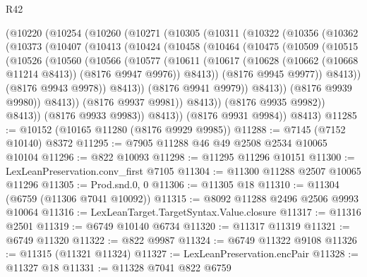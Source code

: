 \begin{lexlean}{R42}
\begin{coremodule}
{      (@10220
        (@10254
          (@10260
            (@10271
              (@10305
                (@10311
                  (@10322
                    (@10356
                      (@10362
                        (@10373
                          (@10407
                            (@10413
                              (@10424
                                (@10458
                                  (@10464
                                    (@10475
                                      (@10509
                                        (@10515
                                          (@10526
                                            (@10560
                                              (@10566
                                                (@10577
                                                  (@10611
                                                    (@10617
                                                      (@10628
                                                        (@10662 (@10668 @11214 @8413))
                                                        (@8176 @9947 @9976))
                                                      @8413))
                                                  (@8176 @9945 @9977))
                                                @8413))
                                            (@8176 @9943 @9978))
                                          @8413))
                                      (@8176 @9941 @9979))
                                    @8413))
                                (@8176 @9939 @9980))
                              @8413))
                          (@8176 @9937 @9981))
                        @8413))
                    (@8176 @9935 @9982))
                  @8413))
              (@8176 @9933 @9983))
            @8413))
        (@8176 @9931 @9984))
      @8413)
@11285 := @10152 (@10165 @11280 (@8176 @9929 @9985))
@11288 := @7145 (@7152 @10140) @8372
@11295 := @7905 @11288 @46 @49 @2508 @2534 @10065 @10104
@11296 := @822 @10093
@11298 := @11295 @11296 @10151
@11300 := LexLeanPreservation.conv_first @7105
@11304 := @11300 @11288 @2507 @10065 @11296
@11305 := Prod.snd.{0, 0}
@11306 := @11305 @18
@11310 := @11304 (@6759 (@11306 @7041 @10092))
@11315 := @8092 @11288 @2496 @2506 @9993 @10064
@11316 := LexLeanTarget.TargetSyntax.Value.closure
@11317 := @11316 @2501
@11319 := @6749 @10140 @6734
@11320 := @11317 @11319
@11321 := @6749 @11320
@11322 := @822 @9987
@11324 := @6749 @11322 @9108
@11326 := @11315 (@11321 @11324)
@11327 := LexLeanPreservation.encPair
@11328 := @11327 @18
@11331 := @11328 @7041 @822 @6759
}
\end{coremodule}
\end{lexlean}
